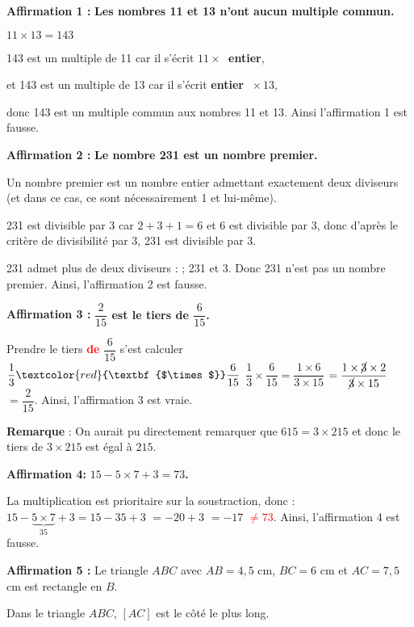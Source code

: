 
\vspace{0.3cm}
\textbf{Affirmation 1 :} \textbf{Les nombres 11 et 13 n'ont aucun multiple commun.}

$11\times13=143$

143 est un multiple de 11 car il s’écrit \textbf{$11 \times~$ entier},

et 143 est un multiple de 13 car il s'écrit \textbf{entier $~ \times13$},

donc 143 est un multiple commun aux nombres 11 et 13. Ainsi l'affirmation 1 est fausse.

\smallskip

\textbf{Affirmation 2 :} \textbf{Le nombre 231 est un nombre premier.}

Un nombre premier est un nombre entier admettant exactement deux diviseurs (et dans ce cas, ce sont nécessairement 1 et lui-même).

231 est divisible par 3 car $2+3+1=6$ et 6 est divisible par 3, donc d'après le critère de divisibilité par 3, 231 est divisible par 3.

231 admet plus de deux diviseurs :  ; 231 et 3. Donc 231 n'est pas un nombre premier. Ainsi, l'affirmation 2 est fausse.

\smallskip

\textbf{Affirmation 3 :} \textbf{$\dfrac{2}{15}$ est le tiers de $\dfrac{6}{15}$.}

Prendre le tiers \textcolor{red}{\textbf{de}} $\dfrac{6}{15}$ s'est calculer $\dfrac{1}{3}\textcolor{red}{\textbf{$\times$}}\dfrac{6}{15}$
$\dfrac{1}{3}\times\dfrac{6}{15}=\dfrac{1\times6}{3\times15}$
$=\dfrac{1\times\cancel{3}\times2}{\cancel{3}\times15}$ 
$=\dfrac{2}{15}$. Ainsi, l'affirmation 3 est vraie. 

\textbf{Remarque} :  On aurait pu directement remarquer que $615=3\times 215$ et donc le tiers de $3\times 215$ est égal à $215$.

\smallskip

\textbf{Affirmation 4:} \textbf{$15 - 5 \times 7 + 3 = 73$. }

La multiplication est prioritaire sur la soustraction, donc : \quad $15 - \underbrace{5 \times 7}_{35} + 3 =15-35+3$
 $=-20+3$
$=-17$ \textcolor{red}{\textbf{$\ne73$}}. \quad Ainsi, l'affirmation 4 est fausse.

\smallskip

\textbf{Affirmation 5 :} \og Le triangle $ABC$ avec $AB = 4,5$ cm, $BC = 6$ cm et $AC = 7,5$ cm est rectangle en $B$\fg.

Dans le triangle $ABC$, $[AC]$ est le côté le plus long.

